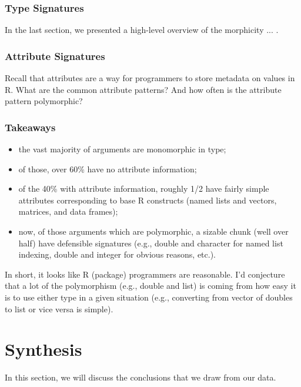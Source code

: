 \documentclass[acmsmall,10pt,review,anonymous]{acmart}\settopmatter{printfolios=true,printccs=false,printacmref=false}
\begin{document}

\subsubsection{Type Signatures}

In the last section, we presented a high-level overview of the morphicity ... .

\subsubsection{Attribute Signatures}

Recall that attributes are a way for programmers to store metadata on values in R.
What are the common attribute patterns?
And how often is the attribute pattern polymorphic?

\subsubsection{Takeaways}

\begin{itemize}
    \item the vast majority of arguments are monomorphic in type;
    \item of those, over 60\% have no attribute information;
    \item of the 40\% with attribute information, roughly 1/2 have fairly simple attributes corresponding to base R constructs (named lists and vectors, matrices, and data frames);
    \item now, of those arguments which are polymorphic, a sizable chunk (well over half) have defensible signatures (e.g., double and character for named list indexing, double and integer for obvious reasons, etc.).
\end{itemize}

In short, it looks like R (package) programmers are reasonable.
I'd conjecture that a lot of the polymorphism (e.g., double and list) is coming from how easy it is to use either type in a given situation (e.g., converting from vector of doubles to list or vice versa is simple).

%
%
%
%
%
%
\section{Synthesis}

In this section, we will discuss the conclusions that we draw from our data.
\end{document}
